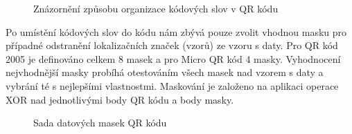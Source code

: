\begin{figure}[H]
  \begin{center}
    \caption{Znázornění způsobu organizace kódových slov v QR kódu}
    \label{PuttingDataCodewordsIntoQRCode}
  \end{center}
\end{figure}

Po umístění kódových slov do kódu nám zbývá pouze zvolit vhodnou masku pro
případné odstranění lokalizačních značek (vzorů) ze vzoru s daty. Pro QR kód
2005 je definováno celkem 8 masek a pro Micro QR kód 4 masky. Vyhodnocení
nejvhodnější masky probíhá otestováním všech masek nad vzorem s daty a vybrání
té s nejlepšími vlastnostmi. Maskování je založeno na aplikaci operace XOR nad
jednotlivými body QR kódu a body masky.

\begin{figure}[H]
  \begin{center}
    \caption{Sada datových masek QR kódu}
    \label{QRCodeDataMasks}
  \end{center}
\end{figure}

